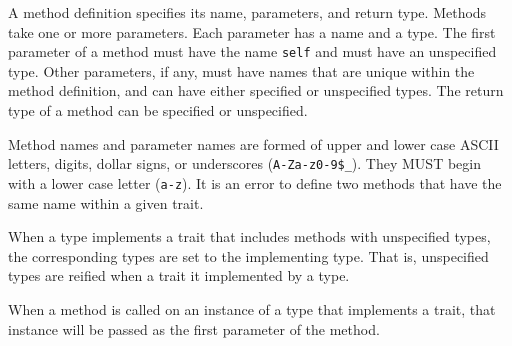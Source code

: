 \documentclass[10pt,twocolumn,a4paper]{article}
\newcommand{\code}[1]{\texttt{#1}}
\begin{document}
A method definition specifies its name, parameters, and return type.
Methods take one or more parameters.
Each parameter has a name and a type.
The first parameter of a method must have the name \code{self} and must
have an unspecified type.
Other parameters, if any, must have names that are unique within the method
definition, and can have either specified or unspecified types.
The return type of a method can be specified or unspecified.

Method names and parameter names are formed of upper and lower case ASCII
letters, digits, dollar signs, or underscores (\code{A-Za-z0-9\$\_}). They
MUST begin with a lower case letter (\code{a-z}).
It is an error to define two methods that have the same name within a given
trait.

When a type implements a trait that includes methods with unspecified
types, the corresponding types are set to the implementing type. That is,
unspecified types are reified when a trait it implemented by a type.

When a method is called on an instance of a type that implements a trait,
that instance will be passed as the first parameter of the method.
\end{document}
